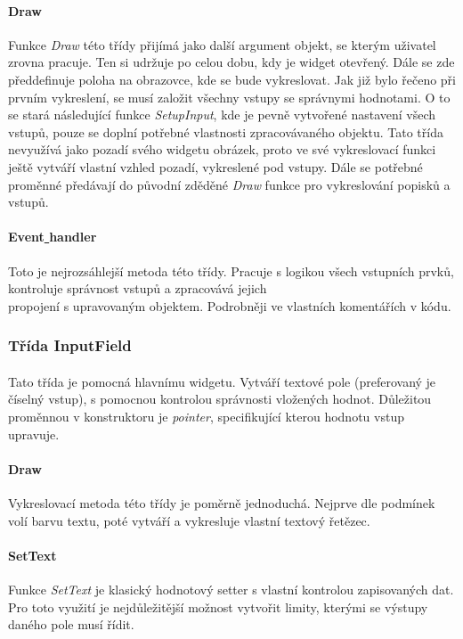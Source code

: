 \documentclass[a4paper, 12pt]{article}
\begin{document}
\paragraph{Draw}
Funkce \emph{Draw} této třídy přijímá jako další argument objekt, se kterým
uživatel zrovna pracuje. Ten si udržuje po celou dobu, kdy je widget otevřený.
Dále se zde předdefinuje poloha na obrazovce, kde se bude vykreslovat. Jak
již bylo řečeno při prvním vykreslení, se musí založit všechny vstupy se
správnymi hodnotami. O to se stará následující funkce \emph{SetupInput}, kde je
pevně vytvořené nastavení všech vstupů, pouze se doplní potřebné vlastnosti
zpracovávaného objektu. Tato třída nevyužívá jako pozadí svého widgetu obrázek,
proto ve své vykreslovací funkci ještě vytváří vlastní vzhled pozadí,
vykreslené pod vstupy. Dále se potřebné proměnné předávají do původní zděděné
\emph{Draw} funkce pro vykreslování popisků a vstupů.

\paragraph{Event\underline{ }handler}
Toto je nejrozsáhlejší metoda této třídy. Pracuje s logikou všech vstupních
prvků, kontroluje správnost vstupů a zpracovává jejich \\propojení s upravovaným
objektem. Podrobněji ve vlastních komentářích v kódu.
\\
\subsubsection{Třída InputField}
\paragraph{}
Tato třída je pomocná hlavnímu widgetu. Vytváří textové pole (preferovaný je
číselný vstup), s pomocnou kontrolou správnosti vložených hodnot. Důležitou
proměnnou v konstruktoru je \emph{pointer}, specifikující kterou hodnotu vstup
upravuje.

\paragraph{Draw}
Vykreslovací metoda této třídy je poměrně jednoduchá. Nejprve dle podmínek volí
barvu textu, poté vytváří a vykresluje vlastní textový řetězec.

\paragraph{SetText}
Funkce \emph{SetText} je klasický hodnotový setter s vlastní kontrolou
zapisovaných dat. Pro toto využití je nejdůležitější možnost vytvořit limity,
kterými se výstupy daného pole musí řídit.
\end{document}
